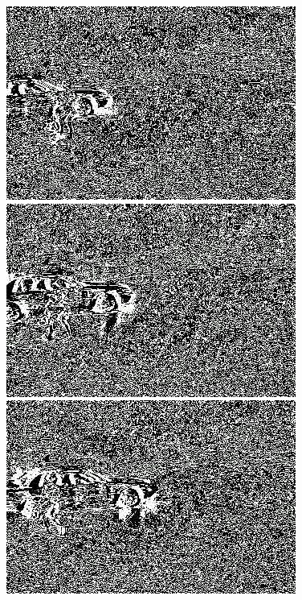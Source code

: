 \documentclass[a4paper]{ctexart}
\begin{document}
\begin{figure}[htbp]
	\centering
	\begin{minipage}[t]{0.2\textwidth}
		\centering
		\includegraphics[width=\textwidth]{figure/frames/sb1400.jpg}
	\end{minipage}
	\begin{minipage}[t]{0.2\textwidth}
		\centering
		\includegraphics[width=\textwidth]{figure/frames/sb1405.jpg}
	\end{minipage}
	\begin{minipage}[t]{0.2\textwidth}
		\centering
		\includegraphics[width=\textwidth]{figure/frames/sb1410.jpg}

\end{minipage}
\end{figure}
\end{document}
